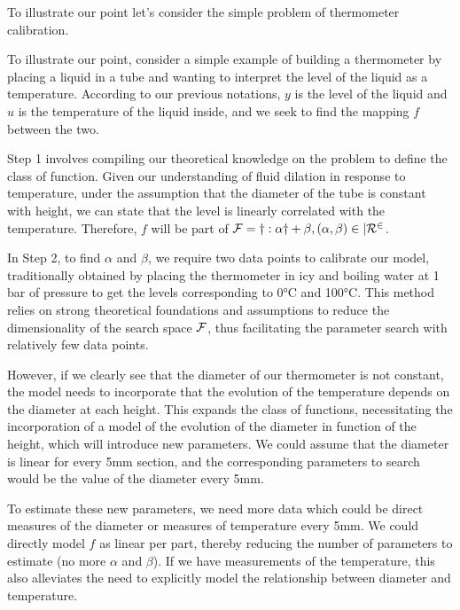 \begin{bibunit}
{{{{{{  To illustrate our point let's consider the simple problem of thermometer calibration.





To illustrate our point, consider a simple example of building a thermometer by placing a liquid in a tube and wanting to interpret the level of the liquid as a temperature. According to our previous notations, $y$ is the level of the liquid and $u$ is the temperature of the liquid inside, and we seek to find the mapping $f$ between the two.

Step 1 involves compiling our theoretical knowledge on the problem to define the class of function. Given our understanding of fluid dilation in response to temperature, under the assumption that the diameter of the tube is constant with height, we can state that the level is linearly correlated with the temperature. Therefore, $f$ will be part of $\cal{F} = { y: \alpha y + \beta , (\alpha, \beta) \in |R^2 }$.

In Step 2, to find $\alpha$ and $\beta$, we require two data points to calibrate our model, traditionally obtained by placing the thermometer in icy and boiling water at 1 bar of pressure to get the levels corresponding to 0°C and 100°C. This method relies on strong theoretical foundations and assumptions to reduce the dimensionality of the search space $\cal{F}$, thus facilitating the parameter search with relatively few data points.

However, if we clearly see that the diameter of our thermometer is not constant, the model needs to incorporate that the evolution of the temperature depends on the diameter at each height. This expands the class of functions, necessitating the incorporation of a model of the evolution of the diameter in function of the height, which will introduce new parameters. We could assume that the diameter is linear for every 5mm section, and the corresponding parameters to search would be the value of the diameter every 5mm.

To estimate these new parameters, we need more data which could be direct measures of the diameter or measures of temperature every 5mm. We could directly model $f$ as linear per part, thereby reducing the number of parameters to estimate (no more $\alpha$ and $\beta$). If we have measurements of the temperature, this also alleviates the need to explicitly model the relationship between diameter and temperature.





}}}}}}
\end{bibunit}
